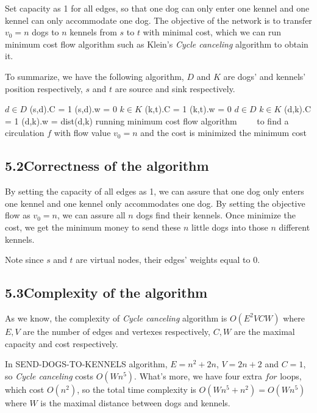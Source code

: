 \documentclass[a4paper,12pt]{article}
\begin{document}
Set capacity as 1 for all edges, so that one dog can only enter one kennel and one kennel can only accommodate one dog. The objective of the network is to transfer $v_0=n$ dogs to $n$ kennels from $s$ to $t$ with minimal cost, which we can run minimum cost flow algorithm such as Klein's \emph{Cycle canceling} algorithm to obtain it.

To summarize, we have the following algorithm, $D$ and $K$ are dogs' and kennels' position respectively, $s$ and $t$ are source and sink respectively.

\begin{codebox}
\li \For $d \in D$
    \Then
\li (s,d).C = 1
\li (s,d).w = 0
    \End
\li \For $k \in K$
    \Then
\li (k,t).C = 1
\li (k,t).w = 0
    \End
\li \For $d \in D$
    \Then
\li \For $k \in K$
    \Then
\li (d,k).C = 1
\li (d,k).w = dist(d,k)
    \End
    \End
\li running minimum cost flow algorithm
\zi ~~~~to find a circulation $f$ with flow value $v_0=n$ and the cost is minimized
\li \Return the minimum cost
\end{codebox}

\subsection*{\textnormal{5.2\quad Correctness of the algorithm}}

By setting the capacity of all edges as 1, we can assure that one dog only enters one kennel and one kennel only accommodates one dog. By setting the objective flow as $v_0=n$, we can assure all $n$ dogs find their kennels. Once minimize the cost, we get the minimum money to send these $n$ little dogs into those $n$ different kennels.

Note since $s$ and $t$ are virtual nodes, their edges' weights equal to 0.

\subsection*{\textnormal{5.3\quad Complexity of the algorithm}}

As we know, the complexity of \emph{Cycle canceling} algorithm is $O(E^2VCW)$ where $E,V$ are the number of edges and vertexes respectively, $C,W$ are the maximal capacity and cost respectively.

In SEND-DOGS-TO-KENNELS algorithm, $E=n^2+2n$, $V=2n+2$ and $C=1$, so \emph{Cycle canceling} costs $O(Wn^5)$. What's more, we have four extra $for$ loops, which cost $O(n^2)$, so the total time complexity is $O(Wn^5+n^2)=O(Wn^5)$ where $W$ is the maximal distance between dogs and kennels.
\end{document}
